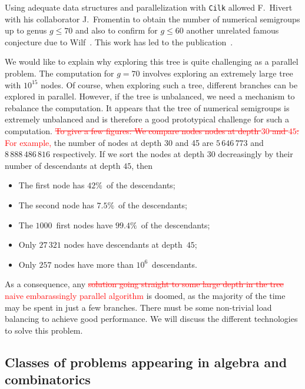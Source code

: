 \documentclass{deliverablereport}
\newcommand{\Cilk}{\texttt{Cilk}\xspace}
\begin{document}
Using adequate data structures and parallelization with \Cilk allowed
F.~Hivert with his collaborator J.~Fromentin to obtain the number of numerical
semigroups up to genus $g \leq 70$ and also to confirm for $g\leq 60$ another
unrelated famous conjecture due to Wilf~\cite{Wilf}. This work has led to the
publication~\cite{FromentinH16}.

We would like to explain why exploring this tree is quite challenging as a
parallel problem. The computation for $g=70$ involves exploring an extremely
large tree with $10^{15}$ nodes. Of course, when exploring such a tree,
different branches can be explored in parallel. However, if the tree is
unbalanced, we need a mechanism to rebalance the computation. It appears that
the tree of numerical semigroups is extremely unbalanced and is therefore a good
prototypical challenge for such a computation. \textcolor{red}{\sout{To give a few figures:
We compare nodes nodes at depth $30$ and $45$:} For example, } the number of nodes at depth 30 and 45
are $5\,646\,773$ and $8\,888\,486\,816$ respectively. If we sort the nodes
at depth $30$ decreasingly by their number of descendants at depth $45$, then
\begin{itemize}
\item The first node has $42\%$~of the descendants;
\item The second node has $7.5\%$~of the descendants;
\item The $1000$~first nodes have $99.4\%$~of the descendants;
\item Only $27\,321$ nodes have descendants at depth~$45$;
\item Only $257$ nodes have more than $10^6$~descendants.
\end{itemize}
As a consequence, any
\textcolor{red}{\sout{solution going straight to some large depth in the tree}}
\textcolor{red}{naive embarassingly parallel algorithm} is doomed, as the majority
of the time may be spent in just a few branches. There must be
some non-trivial load balancing to achieve good performance.  We will discuss the
different technologies to solve this problem.

 
\subsection{Classes of problems appearing in algebra and combinatorics}
\end{document}
